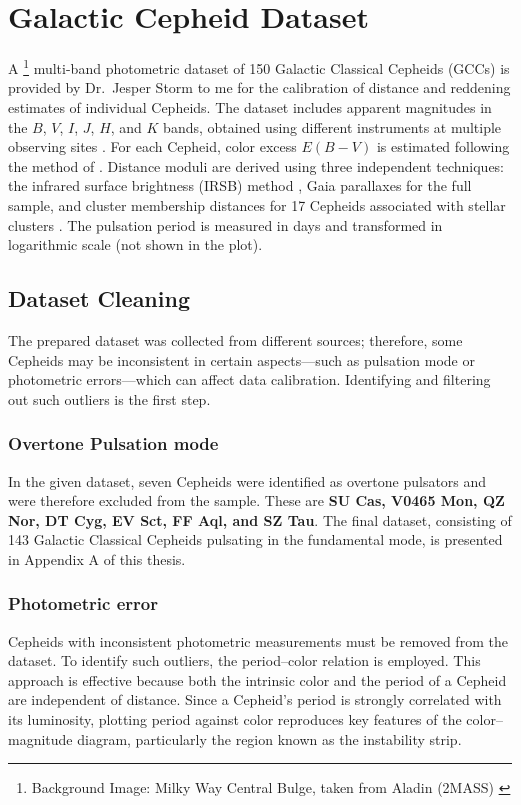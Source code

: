 \chapter{Galactic Cepheid Dataset}
\label{datachap}


\vspace{-0.2cm}

 


A \footnote{Background Image: Milky Way Central Bulge, taken from Aladin (2MASS) \citep{Bonnarel2000, Skrutskie2006}} multi-band photometric dataset of 150 Galactic Classical Cepheids (GCCs) is provided by Dr.~Jesper Storm to me for the calibration of distance and reddening estimates of individual Cepheids. The dataset includes apparent magnitudes in the $B$, $V$, $I$, $J$, $H$, and $K$ bands, obtained using different instruments at multiple observing sites \citep{2011storm}. For each Cepheid, color excess $E(B-V)$ is estimated following the method of \citep{1994fernie}. Distance moduli are derived using three independent techniques: the infrared surface brightness (IRSB) method \citep{2011storm}, Gaia parallaxes for the full sample, and cluster membership distances for 17 Cepheids associated with stellar clusters \citep{2023cruz}. The pulsation period is measured in days and transformed in logarithmic scale (not shown in the plot). 


\section{Dataset Cleaning}

The prepared dataset was collected from different sources; therefore, some Cepheids may be inconsistent in certain aspects—such as pulsation mode or photometric errors—which can affect data calibration. Identifying and filtering out such outliers is the first step.

\subsection{Overtone Pulsation mode}
In the given dataset, seven Cepheids were identified as overtone pulsators and were therefore excluded from the sample. These are \textbf{SU Cas, V0465 Mon, QZ Nor, DT Cyg, EV Sct, FF Aql, and SZ Tau}. The final dataset, consisting of 143 Galactic Classical Cepheids pulsating in the fundamental mode, is presented in Appendix A of this thesis.

\subsection{Photometric error}
Cepheids with inconsistent photometric measurements must be removed from the dataset. To identify such outliers, the period–color relation is employed. This approach is effective because both the intrinsic color and the period of a Cepheid are independent of distance. Since a Cepheid’s period is strongly correlated with its luminosity, plotting period against color reproduces key features of the color–magnitude diagram, particularly the region known as the instability strip.

